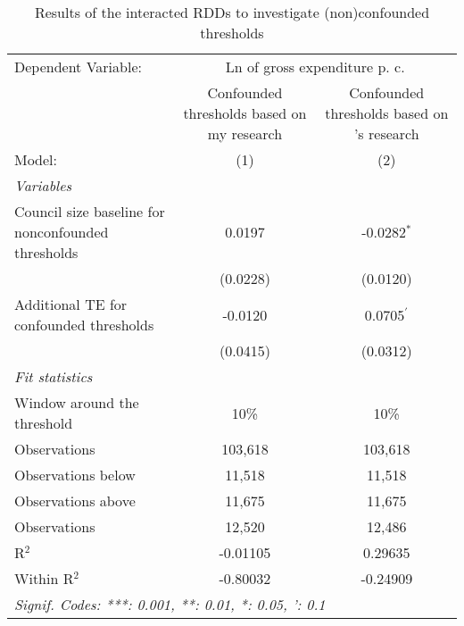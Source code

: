 
\begin{table}
   \caption{\label{tab:rdd_conf_thresholds} Results of the interacted \ac{RDD}s to investigate (non)confounded thresholds}
   \centering
   \begin{tabular}{lcc}
      \tabularnewline \midrule \midrule
      Dependent Variable: & \multicolumn{2}{c}{Ln of gross expenditure p. c.}\\
                                                                              & Confounded thresholds based on my research & Confounded thresholds based on \citeauthor{Hohmann.2017}'s \parencite*{Hohmann.2017} research \\     
      Model:                                                                  & (1)                                        & (2)\\  
      \midrule
      \emph{Variables}\\
      Council size baseline for nonconfounded thresholds                      & 0.0197                                     & -0.0282$^{*}$\\   
                                                                              & (0.0228)                                   & (0.0120)\\   
      Additional TE for confounded thresholds                                 & -0.0120                                    & 0.0705$^{'}$\\   
                                                                              & (0.0415)                                   & (0.0312)\\   
      \midrule
      \emph{Fit statistics}\\
      Window around the threshold & 10\% & 10\%\\
      Observations                                                            & 103,618                                    & 103,618\\  
      Observations below                                                      & 11,518                                     & 11,518\\  
      Observations above                                                      & 11,675                                     & 11,675\\  
      Observations                                                            & 12,520                                     & 12,486\\  
      R$^2$                                                                   & -0.01105                                   & 0.29635\\  
      Within R$^2$                                                            & -0.80032                                   & -0.24909\\  
      \midrule \midrule
      \multicolumn{3}{l}{\emph{Signif. Codes: ***: 0.001, **: 0.01, *: 0.05, ': 0.1}}\\
   \end{tabular}
   

\end{table}
